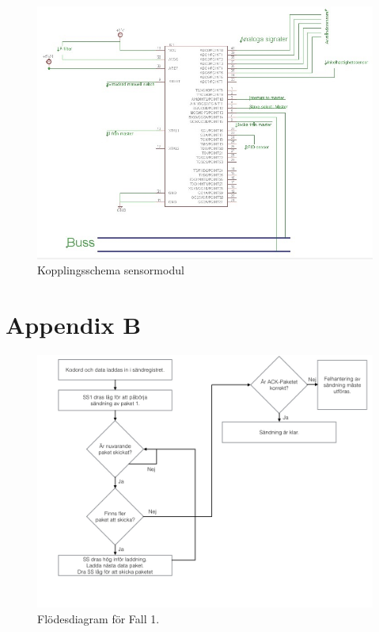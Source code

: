 \documentclass[a4paper,12pt,fleqn]{article}
\begin{document}
\begin{figure}[ht] %
  \begin{center}
  \includegraphics[keepaspectratio=true,width=\linewidth]{sensormodulkoppling.jpg}  %
  \end{center}
  \caption{Kopplingsschema sensormodul} %
  \label{fig:kopplingsensor} %
\end{figure}
 \clearpage %
 

\newpage
\section{Appendix B}

\begin{figure}[htp] %
  \begin{center}
  \includegraphics[keepaspectratio=true,width=\linewidth]{SPIbild002.jpg}  %
  \end{center}
  \caption{Flödesdiagram för Fall 1.} %
  \label{fig:case1flow}
\end{figure}
\end{document}

